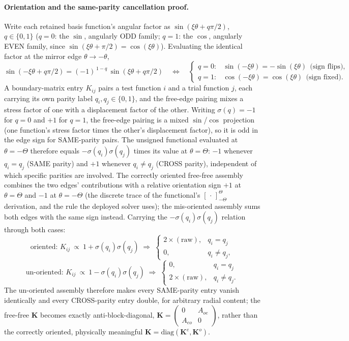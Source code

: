 \documentclass[11pt]{article}
\begin{document}
\paragraph{Orientation and the same-parity cancellation proof.} Write each
retained basis function's angular factor as $\sin(\xi\theta+q\pi/2)$,
$q\in\{0,1\}$ ($q=0$: the $\sin$, angularly ODD family; $q=1$: the $\cos$,
angularly EVEN family, since $\sin(\xi\theta+\pi/2)=\cos(\xi\theta)$).
Evaluating the identical factor at the mirror edge $\theta\to-\theta$,
\[
\sin(-\xi\theta+q\pi/2) = (-1)^{\,1-q}\,\sin(\xi\theta+q\pi/2)
\quad\Longleftrightarrow\quad
\begin{cases}
q=0: & \sin(-\xi\theta)=-\sin(\xi\theta)\ \ \text{(sign flips)},\\
q=1: & \cos(-\xi\theta)=\cos(\xi\theta)\ \ \text{(sign fixed)}.
\end{cases}
\]
A boundary-matrix entry $K_{ij}$ pairs a test function $i$ and a trial
function $j$, each carrying its own parity label $q_i,q_j\in\{0,1\}$, and
the free-edge pairing mixes a stress factor of one with a displacement
factor of the other.
Writing $\sigma(q)=-1$ for $q=0$ and $+1$ for $q=1$, the free-edge pairing
is a mixed $\sin$/$\cos$ projection (one function's stress factor times the
other's displacement factor), so it is odd in the edge sign for SAME-parity
pairs. The unsigned functional evaluated at $\theta=-\Theta$ therefore equals
$-\sigma(q_i)\sigma(q_j)$ times its value at $\theta=\Theta$: $-1$ whenever
$q_i=q_j$ (SAME parity) and $+1$ whenever $q_i\neq q_j$ (CROSS parity),
independent of which specific parities are involved. The correctly oriented
free-free assembly combines the two edges' contributions with a relative
orientation sign $+1$ at $\theta=\Theta$ and $-1$ at $\theta=-\Theta$
(the discrete trace of the functional's $[\,\cdot\,]_{-\Theta}^{\Theta}$
derivation, and the rule the deployed solver uses); the mis-oriented
assembly sums both edges with the same sign instead. Carrying the
$-\sigma(q_i)\sigma(q_j)$ relation through both cases:
\[
\text{oriented: } K_{ij}\ \propto\ 1+\sigma(q_i)\sigma(q_j)
\;\Rightarrow\;
\begin{cases} 2\times(\text{raw}), & q_i=q_j\\ 0, & q_i\neq q_j,\end{cases}
\]
\[
\text{un-oriented: } K_{ij}\ \propto\ 1-\sigma(q_i)\sigma(q_j)
\;\Rightarrow\;
\begin{cases} 0, & q_i=q_j\\ 2\times(\text{raw}), & q_i\neq q_j.\end{cases}
\]
The un-oriented assembly therefore makes every SAME-parity entry vanish
identically and every CROSS-parity entry double, for arbitrary radial
content; the free-free $\mathbf{K}$ becomes exactly anti-block-diagonal,
$\mathbf{K}=\left(\begin{smallmatrix}0 & A_{oe}\\ A_{eo} &
0\end{smallmatrix}\right)$,
rather than the correctly oriented, physically meaningful
$\mathbf{K}=\mathrm{diag}(\mathbf{K}^{e},\mathbf{K}^{o})$.
\end{document}
